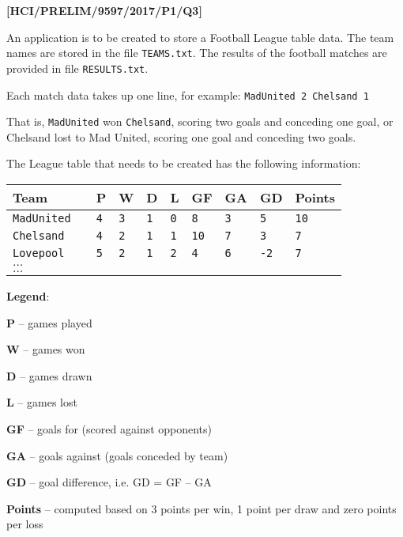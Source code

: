 \item \textbf{{[}HCI/PRELIM/9597/2017/P1/Q3{]} }

An application is to be created to store a Football League table data.
The team names are stored in the file \texttt{TEAMS.txt}. The results
of the football matches are provided in file \texttt{RESULTS.txt}.

Each match data takes up one line, for example: \texttt{MadUnited
2 Chelsand 1 }

That is, \texttt{MadUnited} won \texttt{Chelsand}, scoring two goals
and conceding one goal, or Chelsand lost to Mad United, scoring one
goal and conceding two goals. 

The League table that needs to be created has the following information: 
\noindent \begin{center}
\begin{tabular}{llllllllll}
\textbf{Team} &  & \textbf{P} & \textbf{W} & \textbf{D} & \textbf{L} & \textbf{GF} & \textbf{GA} & \textbf{GD} & \textbf{Points}\tabularnewline
\hline 
\texttt{MadUnited} &  & \texttt{4} & \texttt{3} & \texttt{1} & \texttt{0} & \texttt{8} & \texttt{3} & \texttt{5} & \texttt{10}\tabularnewline
\texttt{Chelsand} &  & \texttt{4} & \texttt{2} & \texttt{1} & \texttt{1} & \texttt{10} & \texttt{7} & \texttt{3} & \texttt{7}\tabularnewline
\texttt{Lovepool} &  & \texttt{5} & \texttt{2} & \texttt{1} & \texttt{2} & \texttt{4} & \texttt{6} & \texttt{-2} & \texttt{7}\tabularnewline
$\dots$ &  &  &  &  &  &  &  &  & \tabularnewline
$\dots$ &  &  &  &  &  &  &  &  & \tabularnewline
\end{tabular}
\par\end{center}

\noindent %
\noindent\begin{minipage}[t]{1\columnwidth}%
\textbf{Legend}: 

\textbf{P} -- games played 

\textbf{W} -- games won

\textbf{D} -- games drawn

\textbf{L} -- games lost 

\textbf{GF} -- goals for (scored against opponents)

\textbf{GA} -- goals against (goals conceded by team)

\textbf{GD} -- goal difference, i.e. GD = GF -- GA

\textbf{Points} -- computed based on 3 points per win, 1 point per
draw and zero points per loss%
\end{minipage}

